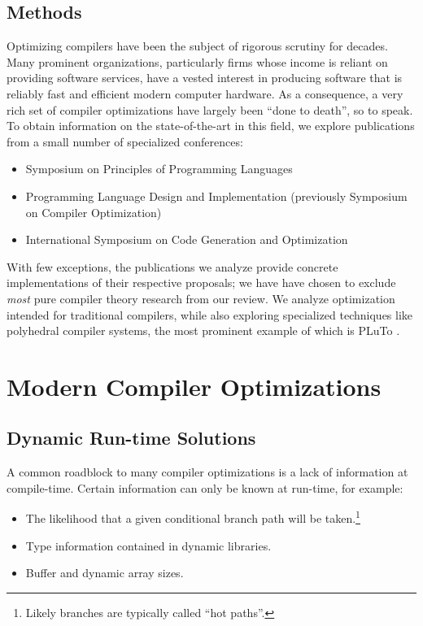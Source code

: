 \documentclass[nobib]{tufte-handout}
\begin{document}
\subsection{Methods}
Optimizing compilers have been the subject of rigorous scrutiny for decades.  Many prominent organizations, particularly firms whose income is reliant on providing software services, have a vested interest in producing software that is reliably fast and efficient modern computer hardware.  As a consequence, a very rich set of compiler optimizations have largely been ``done to death'', so to speak.  To obtain information on the state-of-the-art in this field, we explore publications from a small number of specialized conferences: 
\begin{itemize}
\item Symposium on Principles of Programming Languages
\item Programming Language Design and Implementation (previously Symposium on Compiler Optimization)
\item International Symposium on Code Generation and Optimization
\end{itemize}

With few exceptions, the publications we analyze provide concrete implementations of their respective proposals; we have have chosen to exclude \emph{most} pure compiler theory research from our review.  We analyze optimization intended for traditional compilers, while also exploring specialized techniques like polyhedral compiler systems, the most prominent example of which is PLuTo \cite{Pluto}.  


\section{Modern Compiler Optimizations}


\subsection{Dynamic Run-time Solutions}
A common roadblock to many compiler optimizations is a lack of information at compile-time.  Certain information can only be known at run-time, for example: 
\begin{itemize}
\item The likelihood that a given conditional branch path will be taken.\footnote{Likely branches are typically called ``hot paths''.}
\item Type information contained in dynamic libraries.
\item Buffer and dynamic array sizes.
\end{itemize}
\end{document}
